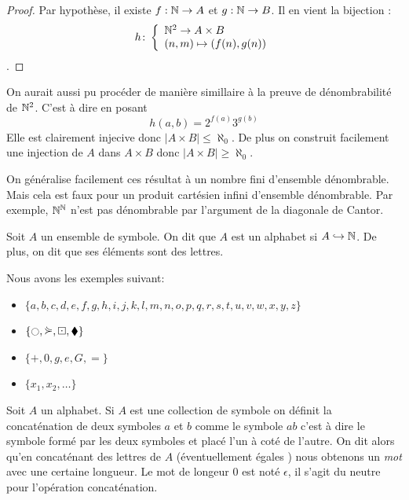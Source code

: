 \begin{proof}
Par hypothèse, il existe $f:\mathbb{N} \to A $ et $g: \mathbb{N} \to B$. Il en vient la bijection :
$$h\colon \left\{\begin{array}{l}\mathbb{N} ^2\to A\times B \\(n,m)\mapsto (f(n),g(n))\end{array}\right.$$. 
\end{proof}

\begin{remarque}
    On aurait aussi pu procéder de manière simillaire à la preuve de dénombrabilité de $\mathbb{N}^2$. C'est à dire en posant $$h(a,b)=2^{f(a)}3^{g(b)}$$
    Elle est clairement injecive donc $|A\times B| \leq \aleph_0$. De plus on construit facilement une injection de $A$ dans $A\times B$ donc $|A\times B|\ge \aleph_0$.
\end{remarque}

\begin{remarque}
    On généralise facilement ces résultat à un nombre fini d'ensemble dénombrable. Mais cela est faux pour un produit cartésien infini d'ensemble dénombrable. Par exemple, $\mathbb{N}^{\mathbb{N}}$ n'est pas dénombrable par l'argument de la diagonale de Cantor. 
\end{remarque}

\begin{definition}
    Soit $A$ un ensemble de symbole. On dit que $A$ est un alphabet si $A \hookrightarrow \mathbb{N}$.
    De plus, on dit que ses éléments sont des lettres.
\end{definition}

\begin{exemple}
    Nous avons les exemples suivant:
    \begin{itemize}
        \item $\{a,b,c,d,e,f,g,h,i,j,k,l,m,n,o,p,q,r,s,t,u,v,w,x,y,z\}$
        \item $\{\fullmoon , \curlyeqsucc, \boxdot, \blacklozenge \}$
        \item $\{+,0,g,e, G,=\}$
        \item $\{x_1,x_2,\dots\}$
    \end{itemize}
\end{exemple}

\begin{remarque}
    Soit $A$ un alphabet. Si $A$ est une collection de symbole on définit la concaténation de deux symboles $a$ et $b$ comme le symbole $ab$ c'est à dire le symbole formé par les deux symboles et placé l'un à coté de l'autre. On dit alors qu'en concaténant des lettres de $A$ (éventuellement égales ) nous obtenons un \emph{mot} avec une certaine longueur. Le mot de longeur $0$ est noté $\epsilon$, il s'agit du neutre pour l'opération concaténation.
\end{remarque}

